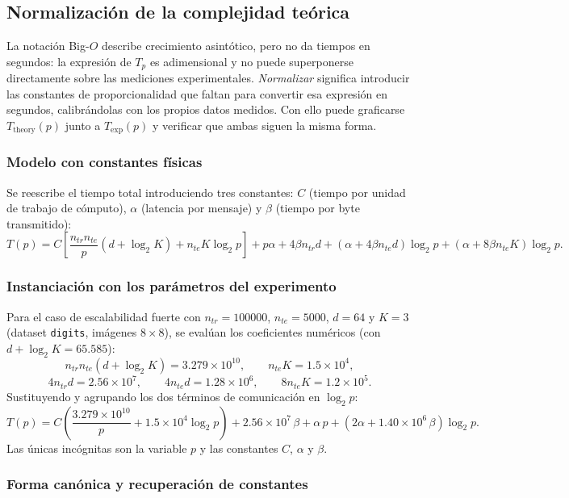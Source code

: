 \subsection{Normalización de la complejidad teórica}\label{sec:normalizacion}

La notación Big-$O$ describe crecimiento asintótico, pero no da tiempos en segundos: la expresión
de $T_p$ es adimensional y no puede superponerse directamente sobre las mediciones experimentales.
\emph{Normalizar} significa introducir las constantes de proporcionalidad que faltan para convertir
esa expresión en segundos, calibrándolas con los propios datos medidos. Con ello puede graficarse
$T_{\text{theory}}(p)$ junto a $T_{\text{exp}}(p)$ y verificar que ambas siguen la misma forma.

\subsubsection{Modelo con constantes físicas}

Se reescribe el tiempo total introduciendo tres constantes: $C$ (tiempo por unidad de trabajo de
cómputo), $\alpha$ (latencia por mensaje) y $\beta$ (tiempo por byte transmitido):
\[
T(p)
=
C\left[
\frac{n_{tr}n_{te}}{p}(d+\log_2 K) + n_{te}K\log_2 p
\right]
+
p\alpha
+
4\beta n_{tr}d
+
(\alpha + 4\beta n_{te}d)\log_2 p
+
(\alpha + 8\beta n_{te}K)\log_2 p.
\]

\subsubsection{Instanciación con los parámetros del experimento}

Para el caso de escalabilidad fuerte con $n_{tr}=100000$, $n_{te}=5000$, $d=64$ y $K=3$
(dataset \texttt{digits}, imágenes $8\times8$), se evalúan los coeficientes numéricos
(con $d+\log_2 K = 65.585$):
\[
n_{tr}n_{te}(d+\log_2 K) = 3.279\times10^{10},
\qquad
n_{te}K = 1.5\times10^4,
\]
\[
4n_{tr}d = 2.56\times10^7,
\qquad
4n_{te}d = 1.28\times10^6,
\qquad
8n_{te}K = 1.2\times10^5.
\]
Sustituyendo y agrupando los dos términos de comunicación en $\log_2 p$:
\[
\boxed{
T(p)
=
C\left(
\frac{3.279\times10^{10}}{p}
+
1.5\times10^4\log_2 p
\right)
+
2.56\times10^7\,\beta
+
\alpha\,p
+
\left(2\alpha + 1.40\times10^6\,\beta\right)\log_2 p
}.
\]
Las únicas incógnitas son la variable $p$ y las constantes $C$, $\alpha$ y $\beta$.

\subsubsection{Forma canónica y recuperación de constantes}

